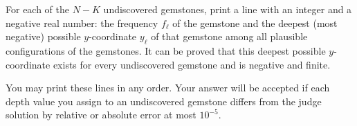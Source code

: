 
For each of the $N-K$ undiscovered gemstones, print a line with an integer and a negative real number: the frequency $f_\ell$ of the gemstone and the deepest (most negative) possible $y$-coordinate $y_\ell$ of that gemstone among all plausible configurations of the gemstones. It can be proved that this deepest possible $y$-coordinate exists for every undiscovered gemstone and is negative and finite.

You may print these lines in any order.
Your answer will be accepted if each depth value you assign to an undiscovered gemstone differs from the judge solution by relative or absolute error at most $10^{-5}$.
